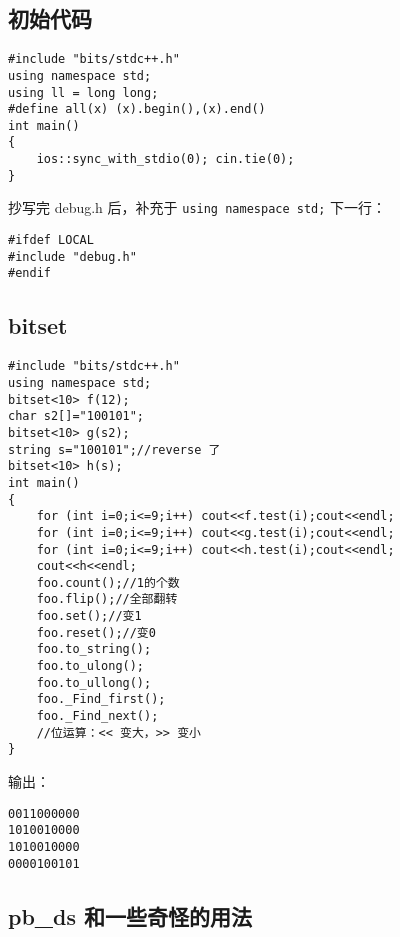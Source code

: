 \documentclass[12pt]{ctexart}
\begin{document}
\subsection{初始代码}

\begin{lstlisting}
#include "bits/stdc++.h"
using namespace std;
using ll = long long;
#define all(x) (x).begin(),(x).end()
int main()
{
	ios::sync_with_stdio(0); cin.tie(0);
}

\end{lstlisting}

抄写完 debug.h 后，补充于 \verb|using namespace std;| 下一行：

\begin{lstlisting}
#ifdef LOCAL
#include "debug.h"
#endif
\end{lstlisting}


\subsection{bitset}

\begin{lstlisting}
#include "bits/stdc++.h"
using namespace std;
bitset<10> f(12);
char s2[]="100101";
bitset<10> g(s2);
string s="100101";//reverse 了
bitset<10> h(s);
int main()
{
	for (int i=0;i<=9;i++) cout<<f.test(i);cout<<endl;
	for (int i=0;i<=9;i++) cout<<g.test(i);cout<<endl;
	for (int i=0;i<=9;i++) cout<<h.test(i);cout<<endl;
	cout<<h<<endl;
    foo.count();//1的个数
	foo.flip();//全部翻转
	foo.set();//变1
	foo.reset();//变0
	foo.to_string();
	foo.to_ulong();
	foo.to_ullong();
	foo._Find_first();
	foo._Find_next();
    //位运算：<< 变大，>> 变小
}
\end{lstlisting}

输出：

\begin{verbatim}
0011000000
1010010000
1010010000
0000100101
\end{verbatim}

\subsection{pb\_ds 和一些奇怪的用法}
\end{document}
